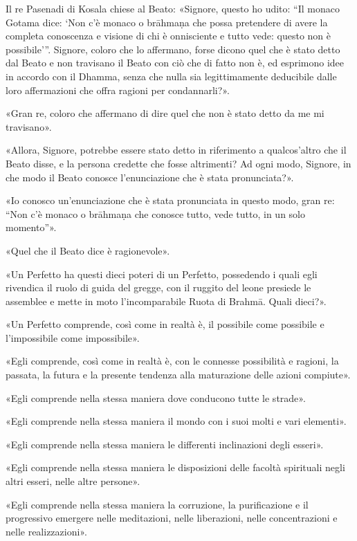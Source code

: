 

Il re Pasenadi di Kosala chiese al Beato: «Signore, questo ho udito: “Il
monaco Gotama dice: ‘Non c’è monaco o brāhmaṇa che possa pretendere di
avere la completa conoscenza e visione di chi è onnisciente e tutto vede:
questo non è possibile’”. Signore, coloro che lo affermano, forse dicono
quel che è stato detto dal Beato e non travisano il Beato con ciò che di
fatto non è, ed esprimono idee in accordo con il Dhamma, senza che nulla
sia legittimamente deducibile dalle loro affermazioni che offra ragioni
per condannarli?».


«Gran re, coloro che affermano di dire quel che non è stato detto da me
mi travisano».


«Allora, Signore, potrebbe essere stato detto in riferimento a
qualcos’altro che il Beato disse, e la persona credette che fosse
altrimenti? Ad ogni modo, Signore, in che modo il Beato conosce
l’enunciazione che è stata pronunciata?».


«Io conosco un’enunciazione che è stata pronunciata in questo modo, gran
re: “Non c’è monaco o brāhmaṇa che conosce tutto, vede tutto, in un solo
momento”».


«Quel che il Beato dice è ragionevole».




\label{pag206}«Un Perfetto ha questi dieci poteri di un Perfetto, possedendo i quali
egli rivendica il ruolo di guida del gregge, con il ruggito del leone
presiede le assemblee e mette in moto l’incomparabile Ruota di Brahmā.
Quali dieci?».


«Un Perfetto comprende, così come in realtà è, il possibile come
possibile e l’impossibile come impossibile».


«Egli comprende, così come in realtà è, con le connesse possibilità e
ragioni, la passata, la futura e la presente tendenza alla maturazione
delle azioni compiute».


«Egli comprende nella stessa maniera dove conducono tutte le strade».


«Egli comprende nella stessa maniera il mondo con i suoi molti e vari
elementi».


«Egli comprende nella stessa maniera le differenti inclinazioni degli
esseri».


«Egli comprende nella stessa maniera le disposizioni delle facoltà
spirituali negli altri esseri, nelle altre persone».


«Egli comprende nella stessa maniera la corruzione, la purificazione e
il progressivo emergere nelle meditazioni, nelle liberazioni, nelle
concentrazioni e nelle realizzazioni».


